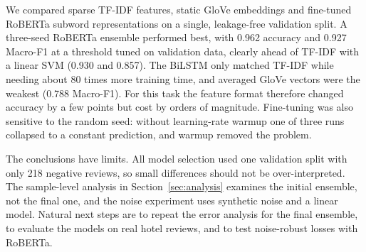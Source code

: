 We compared sparse TF-IDF features, static GloVe embeddings and fine-tuned RoBERTa subword representations on a single, leakage-free validation split.
A three-seed RoBERTa ensemble performed best, with 0.962 accuracy and 0.927 Macro-F1 at a threshold tuned on validation data, clearly ahead of TF-IDF with a linear SVM (0.930 and 0.857).
The BiLSTM only matched TF-IDF while needing about 80 times more training time, and averaged GloVe vectors were the weakest (0.788 Macro-F1).
For this task the feature format therefore changed accuracy by a few points but cost by orders of magnitude.
Fine-tuning was also sensitive to the random seed: without learning-rate warmup one of three runs collapsed to a constant prediction, and warmup removed the problem.

The conclusions have limits.
All model selection used one validation split with only 218 negative reviews, so small differences should not be over-interpreted.
The sample-level analysis in Section~\ref{sec:analysis} examines the initial ensemble, not the final one, and the noise experiment uses synthetic noise and a linear model.
Natural next steps are to repeat the error analysis for the final ensemble, to evaluate the models on real hotel reviews, and to test noise-robust losses with RoBERTa.
